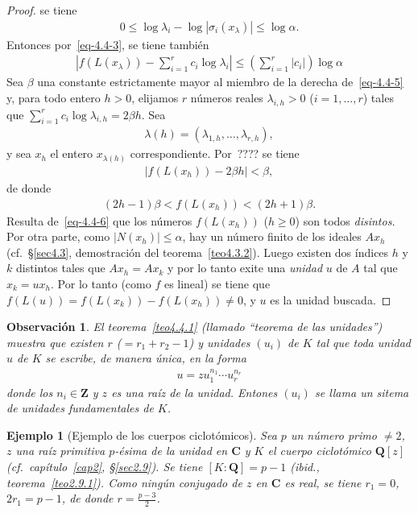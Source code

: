 \documentclass[oneside,bibtotoc,leqno,spanish]{amsbook}
\newcommand{\QQ}{\mathbf{Q}}
\newcommand{\ZZ}{\mathbf{Z}}
\newcommand{\CC}{\mathbf{C}}
\newcommand{\QED}{}%
\newcommand{\abs}[1]{\left\lvert#1\right\rvert}
\numberwithin{equation}{section}
\theoremstyle{defi}
\theoremstyle{note}
\theoremstyle{rem}
\newtheorem*{example*}{Ejemplo}
\newtheorem*{remark*}{Observaci\'on}
\numberwithin{theorem}{section}
\numberwithin{proposition}{section}
\numberwithin{definition}{section}
\numberwithin{lemma}{section}
\numberwithin{corollary}{section}
\numberwithin{example}{section}
\numberwithin{footnote}{section}%
\begin{document}
\begin{proof}
se tiene
\begin{gather}
0\leq\log\lambda_{i}-\log\abs{\sigma_{i}(x_{\lambda})}\leq\log\alpha.
\end{gather}
Entonces por~\eqref{eq-4.4-3}, se tiene tambi\'en
\begin{gather}\label{eq-4.4-5}
\abs{f(L(x_{\lambda}))-\sum_{i=1}^{r}c_{i}\log\lambda_{i}}\leq\left(\sum_{i=1}^{r}\abs{c_{i}}\right)\log\alpha
\end{gather}
Sea $\beta$ una constante estrictamente mayor al miembro de la derecha de~\eqref{eq-4.4-5} y, para todo entero $h>0$,
elijamos $r$ n\'umeros reales $\lambda_{i,h}>0$ ($i=1,\dots,r$) tales que $\sum_{i=1}^{r}c_{i}\log\lambda_{i,h}
=2\beta h$. Sea
\begin{gather*}
\lambda(h)= (\lambda_{1,h},\dots,\lambda_{r,h}),
\end{gather*}
y sea $x_{h}$ el entero $x_{\lambda(h)}$ correspondiente. Por~???? se tiene
\begin{gather*}
\abs{f(L(x_{h}))-2\beta h} < \beta,
\end{gather*}
de donde
\begin{gather}\label{eq-4.4-6}
(2h-1)\beta < f(L(x_{h})) < (2h+1)\beta.
\end{gather}
Resulta de~\eqref{eq-4.4-6} que los n\'umeros $f(L(x_{h}))$ ($h\geq 0$) son todos {\em disintos.} Por otra parte,
como $\abs{N(x_{h})}\leq\alpha$, hay un n\'umero finito de los ideales $Ax_{h}$ (cf.~\S\ref{sec4.3}, demostraci\'on
del teorema~\ref{teo4.3.2}). Luego existen dos \'indices $h$ y $k$ distintos tales que $Ax_{h}=Ax_{k}$ y por lo tanto
exite una {\em unidad} $u$ de $A$ tal que $x_{k} = ux_{h}$. Por lo tanto (como $f$ es lineal) se tiene que
$f(L(u)) = f(L(x_{k})) - f(L(x_{h})) \neq 0$, y $u$ es la unidad buscada. \QED
\end{proof}

\begin{remark*}
El teorema~\ref{teo4.4.1} (llamado ``teorema de las unidades'') muestra que existen $r$ ($=r_{1}+r_{2}-1$) y unidades $(u_{i})$
de $K$ tal que toda unidad $u$ de $K$ se escribe, de manera \'unica, en la forma
\begin{gather}
u = zu_{1}^{n_{1}}\cdots u_{r}^{n_{r}}
\end{gather}
donde los $n_{i}\in\ZZ$ y $z$ es una ra\'iz de la unidad. Entones $(u_{i})$ se llama un {\em sitema de unidades
fundamentales} de $K$.
\end{remark*}

\begin{example*}[Ejemplo de los cuerpos ciclot\'omicos]
Sea $p$ un n\'umero primo $\neq 2$, $z$ una
ra\'iz primitiva $p$-\'esima de la unidad en $\CC$ y $K$ el cuerpo ciclot\'omico $\QQ[z]$
(cf.~cap\'itulo~\ref{cap2}, \S\ref{sec2.9}). Se tiene $[K:\QQ] = p-1$ ({\itshape ibid.}, teorema~\ref{teo2.9.1}). Como ning\'un conjugado de
$z$ en $\CC$ es real, se tiene $r_{1}=0$, $2r_{1} = p-1$, de donde $r = \frac{p-3}{2}$.
\end{example*}
\end{document}
